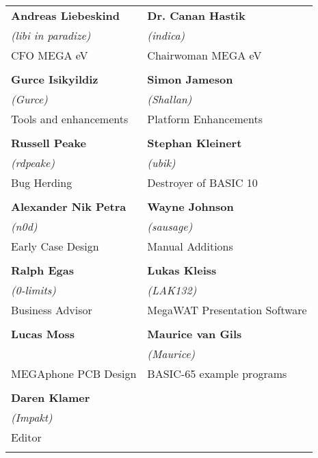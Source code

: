 \setlength{\tabcolsep}{1mm}
\begin{tabular}{p{6cm}p{6cm}}

{\large\bf Andreas Liebeskind}     & {\large\bf Dr. Canan Hastik} \\
 \textit{(libi in paradize)}       & \textit{(indica)} \\
CFO MEGA eV                        & Chairwoman MEGA eV \\
& \\
{\large\bf Gurce Isikyildiz}       & {\large\bf Simon Jameson} \\
 \textit{(Gurce)}                  &  \textit{(Shallan)} \\
Tools and enhancements             & Platform Enhancements \\
& \\
{\large\bf Russell Peake}          & {\large\bf Stephan Kleinert} \\
  \textit{(rdpeake)}               & \textit{(ubik)}        \\
Bug Herding                        & Destroyer of BASIC 10     \\
& \\
{\large\bf Alexander Nik Petra}    & {\large\bf Wayne Johnson} \\
 \textit{(n0d)}                    &  \textit{(sausage)} \\
Early Case Design                  & Manual Additions \\
& \\
{\large\bf Ralph Egas}             & {\large\bf Lukas Kleiss} \\
 \textit{(0-limits)}               & \textit{(LAK132)} \\
Business Advisor                   & MegaWAT Presentation Software \\
& \\
{\large\bf Lucas Moss}             & {\large\bf Maurice van Gils }  \\
                                   & \textit{(Maurice)}  \\
MEGAphone PCB Design               & BASIC-65 example programs \\
& \\
{\large\bf Daren Klamer}           \\
 \textit{(Impakt)}                 \\
Editor                             \\
& \\
\end{tabular}

